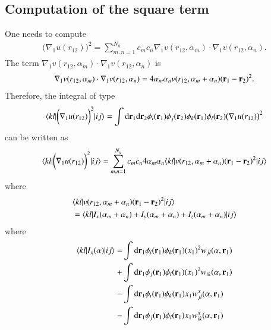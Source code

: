 \documentclass[aip,jcp,reprint,noshowkeys,superscriptaddress]{revtex4-1}
\newcommand{\matelem}[3]{\langle #1 | #2 | #3 \rangle}
\newcommand{\bri}[1]{{\bf r}_{#1}}
\begin{document}
\subsection{Computation of the square term}
One needs to compute 
\begin{equation}
 \begin{aligned}
 \bigg( \nabla_1 u(r_{12}) \bigg)^2 = \sum_{m,n=1}^{N_g} c_m c_n \nabla_1 v(r_{12},\alpha_m) \cdot \nabla_1 v(r_{12},\alpha_n).
 \end{aligned}
\end{equation}
The term $\nabla_1 v(r_{12},\alpha_m) \cdot \nabla_1 v(r_{12},\alpha_n)$ is 
\begin{equation}
 \nabla_1 v(r_{12},\alpha_m) \cdot \nabla_1 v(r_{12},\alpha_n) = 4 \alpha_m \alpha_n v(r_{12}, \alpha_m + \alpha_n) (\bri{1}- \bri{2})^2.
\end{equation}
Therefore, the integral of type 
\begin{equation}
 \matelem{kl}{\bigg( \nabla_1 u(r_{12}) \bigg)^2}{ij} = \int \text{d}\bri{1}  \text{d}\bri{2} \phi_i(\bri{1}) \phi_j(\bri{2}) \phi_k(\bri{1}) \phi_l(\bri{2}) \big(\nabla_1 u(r_{12}) \big)^2
\end{equation}
can be written as  
\begin{equation}
 \matelem{kl}{\bigg( \nabla_1 u(r_{12}) \bigg)^2}{ij} = \sum_{m,n=1}^{N_g} c_m c_n  4 \alpha_m \alpha_n \matelem{kl}{v(r_{12}, \alpha_m + \alpha_n) (\bri{1}- \bri{2})^2}{ij} 
\end{equation}
where 
\begin{equation}
 \begin{aligned}
 &\matelem{kl}{v(r_{12}, \alpha_m + \alpha_n) (\bri{1}- \bri{2})^2}{ij} \\& = \matelem{kl}{I_x(\alpha_m + \alpha_n) + I_y(\alpha_m + \alpha_n) + I_z(\alpha_m + \alpha_n)}{ij}
 \end{aligned}
\end{equation}
where 
\begin{equation}
 \begin{aligned}
 \matelem{kl}{I_x(\alpha)}{ij}=& \int \text{d}\bri{1} \phi_i(\bri{1}) \phi_k(\bri{1}) (x_1)^2 w_{jl}(\alpha,\bri{1}) \\
                              +& \int \text{d}\bri{1} \phi_j(\bri{1}) \phi_l(\bri{1}) (x_1)^2 w_{ik}(\alpha,\bri{1}) \\
                              -& \int \text{d}\bri{1} \phi_i(\bri{1}) \phi_k(\bri{1}) x_1 w_{jl}^x(\alpha,\bri{1}) \\
                              -& \int \text{d}\bri{1} \phi_j(\bri{1}) \phi_l(\bri{1}) x_1 w_{ik}^x(\alpha,\bri{1}) \\
 \end{aligned}
\end{equation}
\end{document}
